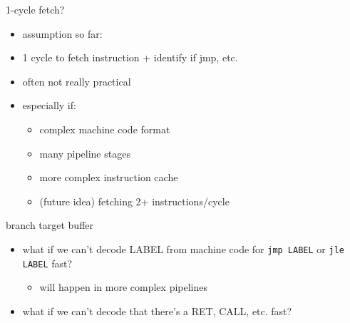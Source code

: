 \usetikzlibrary{matrix}

\begin{frame}{1-cycle fetch?}
    \begin{itemize}
    \item assumption so far:
    \item 1 cycle to fetch instruction + identify if jmp, etc.
        \vspace{.5cm}
    \item often not really practical
    \item especially if:
        \begin{itemize}
        \item complex machine code format
        \item many pipeline stages
        \item more complex instruction cache
        \item (future idea) fetching 2+ instructions/cycle
        \end{itemize}
    \end{itemize}
\end{frame}

\begin{frame}{branch target buffer}
    \begin{itemize}
    \item what if we can't decode LABEL from machine code for \texttt{jmp LABEL} or \texttt{jle LABEL} fast?
        \begin{itemize}
        \item will happen in more complex pipelines
        \end{itemize}
    \item what if we can't decode that there's a RET, CALL, etc. fast?
    \end{itemize}
\end{frame}

